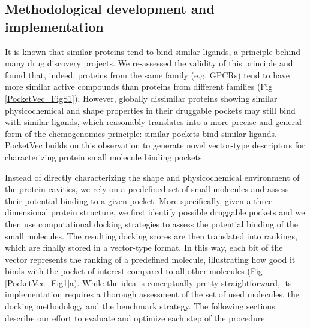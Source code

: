 


\subsection{Methodological development and implementation}

It is known that similar proteins tend to bind similar ligands\cite{klabunde_chemogenomic_2007}, a principle behind many drug discovery projects\cite{sydow_advances_2019, keiser_relating_2007, falaguera_illuminating_2023}. We re-assessed the validity of this principle and found that, indeed, proteins from the same family (e.g. GPCRs) tend to have more similar active compounds than proteins from different families (Fig \ref{PocketVec_FigS1}). However, globally dissimilar proteins showing similar physicochemical and shape properties in their druggable pockets may still bind with similar ligands, which reasonably translates into a more precise and general form of the chemogenomics principle: similar pockets bind similar ligands\cite{gao_comprehensive_2013}. PocketVec builds on this observation to generate novel vector-type descriptors for characterizing protein small molecule binding pockets. 

Instead of directly characterizing the shape and physicochemical environment of the protein
cavities, we rely on a predefined set of small molecules and assess their potential binding to a
given pocket. More specifically, given a three-dimensional protein structure, we first identify
possible druggable pockets and we then use computational docking strategies to assess the
potential binding of the small molecules. The resulting docking scores are then translated into
rankings, which are finally stored in a vector-type format. In this way, each bit of the vector
represents the ranking of a predefined molecule, illustrating how good it binds with the pocket of
interest compared to all other molecules (Fig \ref{PocketVec_Fig1}a). While the idea is conceptually pretty straightforward, its implementation requires a thorough assessment of the set of used molecules, the docking methodology and the benchmark strategy. The following sections describe our effort to evaluate and optimize each step of the procedure.



